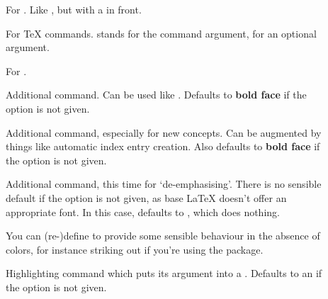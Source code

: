 \begin{slide}
\begin{description}
  \item[]
    For . Like , but with a \macroname{} in
    front.

  \item[]
     For \TeX{} commands. 
    stands for the command argument,  for an optional argument.

  \item[]
    For .
  \end{description}

  \newslide

  \begin{description}
  \item[]
    Additional  command. Can be used like . Defaults
    to \textbf{bold face} if the  option is not given.

  \item[]
    Additional  command, especially for new concepts. Can be
    augmented by things like automatic index entry creation. Also defaults to \textbf{bold face} if the
     option is not given.

  \item[]
    Additional  command, this time for `de-emphasising'. There is
    no sensible default if the  option is not given, as base \LaTeX{} doesn't offer an appropriate
    font. In this case,  defaults to , which does nothing.

    You can (re-)define  to provide some sensible behaviour in the absence of colors, for
    instance striking out if you're using the
    \href{ftp://ftp.dante.de/tex-archive/help/Catalogue/entries/soul.html}{} package.
  \end{description}


  \begin{description}
  \item[]
    Highlighting command which puts its argument into a . Defaults to an  if the  option is not given.


\end{description}
\end{slide}
